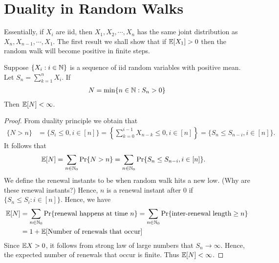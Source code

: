 \documentclass[a4paper,10pt,english]{article}
\begin{document}
\section{Duality in Random Walks}
Essentially, if $X_i$ are iid, then $X_1,X_2,\cdots,X_n$ has the same joint distribution as $X_n, X_{n-1},\cdots, X_1$. The first result we shall show that if $\mathbb{E}[X_1] >0 $ then the random walk will become positive in finite steps. 
\begin{prop}
Suppose $\{X_i: i \in \mathbb{N}\}$ is a sequence of iid random variables with positive mean. Let $S_n = \sum_{k=1}^n X_i$. If 
\begin{align*}N = \min \{n \in \mathbb{N} : S_n > 0\}\end{align*}
Then $\mathbb{E}[N] < \infty$.
\end{prop}
\begin{proof} From duality principle we obtain that
\begin{align*}
\{N > n\} &= \{S_i \leq 0, i \in [n]\} = \left\{\sum_{k=0}^{i-1}X_{n-k} \leq 0, i \in [n]\right\} = \{S_n \leq S_{n-i}, i \in [n]\}.
\end{align*}
It follows that 
\begin{align*}
\mathbb{E}[N] &= \sum_{n \in \mathbb{N}_0} \Pr\{N > n\}
= \sum_{n \in \mathbb{N}_0} \Pr\{S_n \leq S_{n-i}, i \in [n]\}.
\end{align*}
We define the renewal instants to be when random walk hits a new low. (Why are these renewal instants?) 
Hence, $n$ is a renewal instant after $0$ if $\{S_n \leq S_i: i \in [n]\}$. Hence, we have
\begin{align*}
\mathbb{E}[N] &= \sum_{n\in \mathbb{N}_0}\Pr\{\text{renewal happens at time } n\} = \sum_{n \in \mathbb{N}_0}\Pr\{\text{inter-renewal length} \geq n\}\\
&= 1 + \mathbb{E}[\text{Number of renewals that occur}]
\end{align*}
%
Since $\mathbb{E} X > 0$, it follows from strong law of large numbers that $S_n \to \infty$. Hence, the expected number of renewals that occur is finite. Thus $\mathbb{E}[N] < \infty$.
\end{proof}
\end{document}
